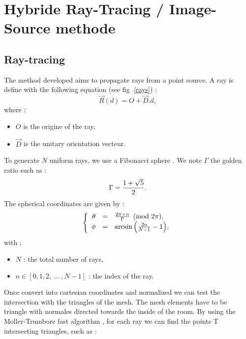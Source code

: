 \documentclass[AMA,STIX1COL]{WileyNJD-v2}
\begin{document}
\section{Hybride Ray-Tracing / Image-Source methode}\label{sec3}
\subsection{Ray-tracing \cite{raytracing}}

The method developed aims to propagate rays from a point source. A ray is define with the following equation (see fig .\ref{rays}) :
\begin{equation}
\overrightarrow{R}(d) = O + \overrightarrow{D}.d,
\end{equation}
where :
\begin{itemize}
\item $O$ is the origine of the ray,
\item $\overrightarrow{D}$ is the unitary orientation vecteur.
\end{itemize}

To generate $N$ uniform rays, we use a Fibonacci sphere \cite{fibonacci}. We note $\Gamma$ the golden ratio such as :
\begin{equation}
\Gamma = \frac{1 + \sqrt{5}}{2}. \\
\end{equation}
%
The spherical coordinates are given by :
\begin{equation}
  \left \{
   \begin{array}{r c l}
\theta &=& \frac{2 \pi \times n}{\Gamma}  \pmod{2\pi},  \\
\phi &=& \arcsin{\left(\frac{2n}{N-1}-1\right)}, 
   \end{array}
   \right .
\end{equation}
%
with : 
\begin{itemize}
\item $N$ : the total number of rays,
\item $n \in[0, 1, 2, \ ... \ ,N-1]$ : the index of the ray.
\end{itemize}
%
Once convert into cartesian coordinates and normalized we can test the intersection with the triangles of the mesh. The mesh elements have to be triangle with normales directed towards the inside of the room. By using the Moller-Trumbore fast algorithm \cite{moller}, for  each ray we can find the points T intersecting triangles, such as :
\end{document}
